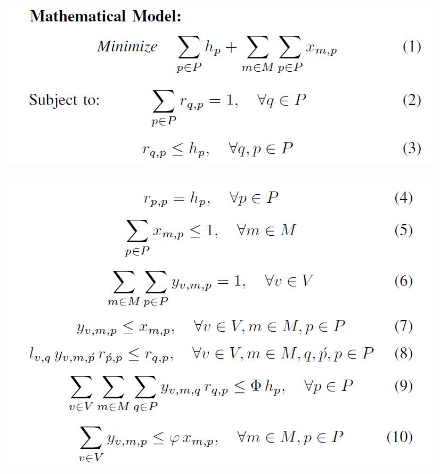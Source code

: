 \begin{figure} [H]
	\centering
	\includegraphics[width=0.7\linewidth]{"figures/math model 1"}
	{\caption*{}}
	\label{}
\end{figure}

\begin{figure}[H]
	\centering
	\includegraphics[width=0.7\linewidth]{"figures/math model 2"}
	{\caption*{}}
	\label{}
\end{figure}
